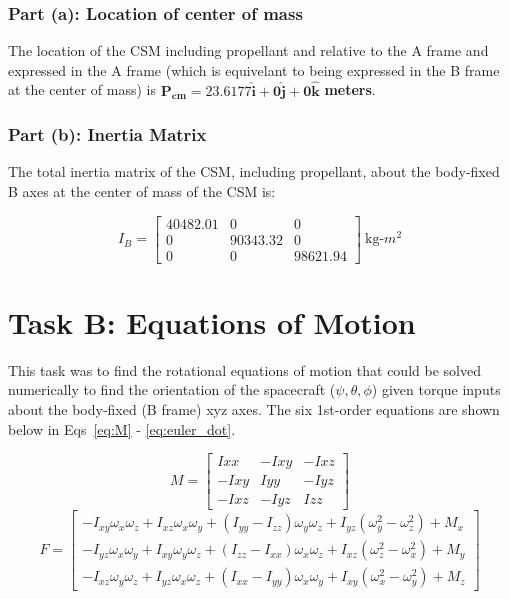 \documentclass{article}
\begin{document}
\subsubsection{Part (a): Location of center of mass}
The location of the CSM including propellant and relative to the A frame and expressed in the A frame (which is equivelant to being expressed in the B frame at the center of mass) is $\mathbf{P_{cm} = 23.6177\hat{i} + 0\hat{j} + 0\hat{k}}$ \textbf{meters}.

\subsubsection{Part (b): Inertia Matrix}
The total inertia matrix of the CSM, including propellant, about the body-fixed B axes at the center of mass of the CSM is: 

\[
I_B=
  \begin{bmatrix}
    40482.01 & 0 & 0 \\
    0 & 90343.32 & 0 \\
    0 & 0 & 98621.94
  \end{bmatrix} \:\text{kg-$m^2$}
\]

\section{Task B: Equations of Motion}
This task was to find the rotational equations of motion that could be solved numerically to find the orientation of the spacecraft ($\psi, \theta, \phi$) given torque inputs about the body-fixed (B frame) xyz axes. The six 1st-order equations are shown below in Eqs~\ref{eq:M} - \ref{eq:euler_dot}.

\begin{equation}\label{eq:M}
M=
  \begin{bmatrix}
    Ixx & -Ixy & -Ixz \\
    -Ixy & Iyy & -Iyz \\
    -Ixz & -Iyz & Izz
  \end{bmatrix}
\end{equation}
\begin{equation}
F = 
  \begin{bmatrix}
  -I_{xy} \omega_x \omega_z + I_{xz} \omega_x \omega_y + (I_{yy} - I_{zz}) \omega_y \omega_z + I_{yz} (\omega_y^2 - \omega_z^2) + M_x \\
  -I_{yz} \omega_x \omega_y + I_{xy} \omega_y \omega_z + (I_{zz} - I_{xx}) \omega_x \omega_z + I_{xz} (\omega_z^2 - \omega_x^2) + M_y \\
  -I_{xz} \omega_y \omega_z + I_{yz} \omega_x \omega_z + (I_{xx} - I_{yy}) \omega_x \omega_y + I_{xy} (\omega_x^2 - \omega_y^2) + M_z
  \end{bmatrix}
\end{equation}
\end{document}
